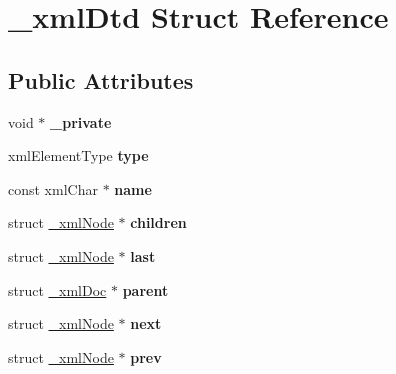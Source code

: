 \hypertarget{struct__xml_dtd}{}\section{\+\_\+xml\+Dtd Struct Reference}
\label{struct__xml_dtd}
\subsection*{Public Attributes}
\begin{DoxyCompactItemize}
\item 
\mbox{\label{struct__xml_dtd_a61a1038a006bf0e6a5419c8c7ba31650}} 
void $\ast$ {\bfseries \+\_\+private}
\item 
\mbox{\label{struct__xml_dtd_a823418c1633bafc9bb653ddb4228bb1b}} 
xml\+Element\+Type {\bfseries type}
\item 
\mbox{\label{struct__xml_dtd_a956c542a2f8f36eca0d1ca732de4ffa1}} 
const xml\+Char $\ast$ {\bfseries name}
\item 
\mbox{\label{struct__xml_dtd_ad21db7d7c006d6f5b677cbc186794c92}} 
struct \mbox{\hyperlink{struct__xml_node}{\+\_\+xml\+Node}} $\ast$ {\bfseries children}
\item 
\mbox{\label{struct__xml_dtd_a987026be4bdc222950867088b9a773f3}} 
struct \mbox{\hyperlink{struct__xml_node}{\+\_\+xml\+Node}} $\ast$ {\bfseries last}
\item 
\mbox{\label{struct__xml_dtd_ae24fc717f1eea8d7de73adddc1ea9d98}} 
struct \mbox{\hyperlink{struct__xml_doc}{\+\_\+xml\+Doc}} $\ast$ {\bfseries parent}
\item 
\mbox{\label{struct__xml_dtd_a7a71339012cb16a7808dc669202434f6}} 
struct \mbox{\hyperlink{struct__xml_node}{\+\_\+xml\+Node}} $\ast$ {\bfseries next}
\item 
\mbox{\label{struct__xml_dtd_a22a38c614122e7ec48b593de6b7e7d03}} 
struct \mbox{\hyperlink{struct__xml_node}{\+\_\+xml\+Node}} $\ast$ {\bfseries prev}
\item 
\mbox{\label{struct__xml_dtd_a18f3c011bb87c79ae95bbecef3dd0b8a}} 

\end{DoxyCompactItemize}
